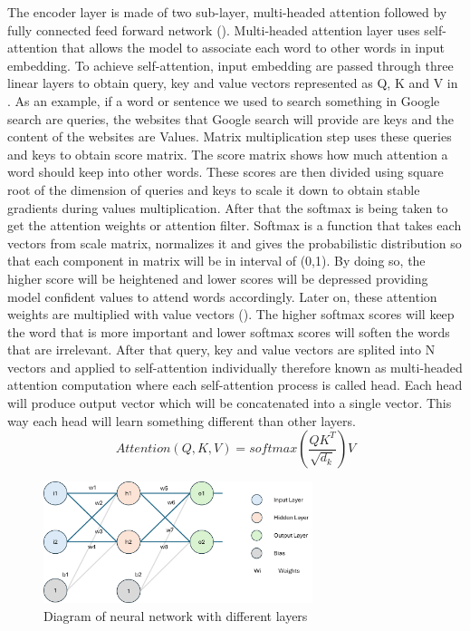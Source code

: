 The encoder layer is made of two sub-layer, multi-headed attention followed by fully connected feed forward network (). Multi-headed attention layer uses self-attention that allows the model to associate each word to other words in input embedding. To achieve self-attention, input embedding are passed through three linear layers to obtain query, key and value vectors represented as Q, K and V in . As an example, if a word or sentence we used to search something in Google search are queries, the websites that Google search will provide are keys and the content of the websites are Values. Matrix multiplication step uses these queries and keys to obtain score matrix. The score matrix shows how much attention a word should keep into other words. These scores are then divided using square root of the dimension of queries and keys to scale it down to obtain stable gradients during values multiplication. After that the softmax is being taken to get the attention weights or attention filter. Softmax is a function that takes each vectors from scale matrix, normalizes it and gives the probabilistic distribution so that each component in matrix will be in interval of (0,1). By doing so, the higher score will be heightened and lower scores will be depressed providing model confident values to attend words accordingly. Later on, these attention weights are multiplied with value vectors (). The higher softmax scores will keep the word that is more important and lower softmax scores will soften the words that are irrelevant. After that query, key and value vectors are splited into N vectors and applied to self-attention individually therefore known as multi-headed attention computation where each self-attention process is called head. Each head will produce output vector which will be concatenated into a single vector. This way each head will learn something different than other layers. 
\begin{equation}
    Attention(Q,K,V) = softmax\left(\frac{QK^T}{\sqrt{d_k}}\right)V
    \label{eq:Attention}
\end{equation}


\begin{figure}[hb]
    \centering
    \includegraphics[width=0.7\textwidth]{chapters/images/Transformer/neuralnet.png}
    \caption{Diagram of neural network with different layers}
    \label{fig:neuralnet}
\end{figure}

